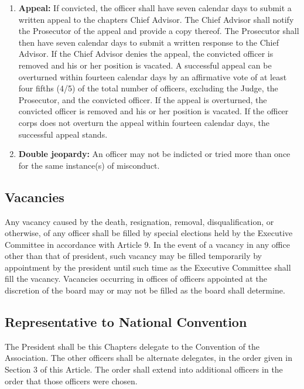 \documentclass{article}
\begin{document}
\begin{enumerate}[\indent (a)]
		\item \textbf{Appeal:} If convicted, the officer shall have seven calendar days to submit a written appeal to the chapter\textquotesingle s Chief Advisor. The Chief Advisor shall notify the Prosecutor of the appeal and provide a copy thereof. The Prosecutor shall then have seven calendar days to submit a written response to the Chief Advisor. If the Chief Advisor denies the appeal, the convicted officer is removed and his or her position is vacated. A successful appeal can be overturned within fourteen calendar days by an affirmative vote of at least four fifths (4/5) of the total number of officers, excluding the Judge, the Prosecutor, and the convicted officer. If the appeal is overturned, the convicted officer is removed and his or her position is vacated. If the officer corps does not overturn the appeal within fourteen calendar days, the successful appeal stands. 
		\item \textbf{Double jeopardy:} An officer may not be indicted or tried more than once for the same instance(s) of misconduct.
	\end{enumerate}
	\subsection{Vacancies}
	Any vacancy caused by the death, resignation, removal, disqualification, or otherwise, of any officer shall be filled by special elections held by the Executive Committee in accordance with Article 9. In the event of a vacancy in any office other than that of president, such vacancy may be filled temporarily by appointment by the president until such time as the Executive Committee shall fill the vacancy. Vacancies occurring in offices of officers appointed at the discretion of the board may or may not be filled as the board shall determine.
	\subsection{Representative to National Convention}
	The President shall be this Chapter\textquotesingle s delegate to the Convention of the Association. The other officers shall be alternate delegates, in the order given in Section 3 of this Article. The order shall extend into additional officers in the order that those officers were chosen.
\end{document}
